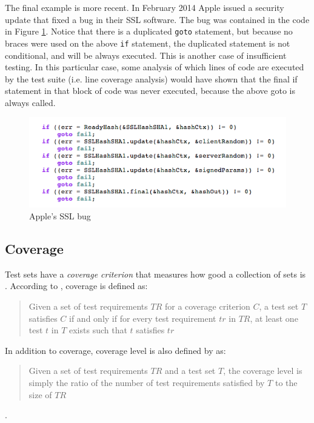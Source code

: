 The final example is more recent. In February 2014 Apple issued a security update that fixed a bug in their SSL software. The bug was contained in the code in Figure \ref{fig:AppleBug}. Notice that there is a duplicated \verb|goto| statement, but because no braces were used on the above \verb|if| statement, the duplicated statement is not conditional, and will be always executed. This is another case of insufficient testing. In this particular case, some analysis of which lines of code are executed by the test suite (i.e. line coverage analysis) would have shown that the final if statement in that block of code was never executed, because the above goto is always called.

\begin{figure}
	\centering
	\includegraphics[scale=0.4]{figures/appleBug.png}
	\caption{Apple's SSL bug}
	\label{fig:AppleBug}
\end{figure}

\subsection{Coverage}

Test sets have a \emph{coverage criterion} that measures how good a collection of sets is \citep{softwareTestingIntro}. According to \citet{softwareTestingIntro}, coverage is defined as:

\begin{quote} Given a set of test requirements $TR$ for a coverage criterion $C$, a test set $T$ satisfies $C$ if and only if for every test requirement $tr$ in $TR$, at least one test $t$ in $T$ exists such that $t$ satisfies $tr$ \end{quote}

In addition to coverage, coverage level is also defined by \citep{softwareTestingIntro} as:

\begin{quote}Given a set of test requirements $TR$ and a test set $T$, the coverage level is simply the ratio of the number of test requirements satisfied by $T$ to the size of $TR$\end{quote}.

